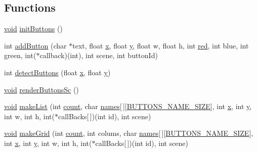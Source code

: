 \subsection*{Functions}
\begin{DoxyCompactItemize}
\item 
\hyperlink{png_8h_ac9c84fa68bbad002983e35ce3663c686}{void} \hyperlink{group___button_ga27d3ba5afb772cc36c9a432c28975ace}{init\+Buttons} ()
\item 
int \hyperlink{group___button_ga5e234145cd86fdd4aaa76eedb8ffae96}{add\+Button} (char $\ast$text, float \hyperlink{fmaths_8inl_a7ba8ab2f1e8f362163e17da3f15a5db9}{x}, float \hyperlink{fmaths_8inl_ad01ab75ae50a1a624185bfa014c66cfa}{y}, float w, float h, int \hyperlink{png_8h_a785e03b9f52b7b9ca5116a272adc908f}{red}, int blue, int green, int($\ast$callback)(int), int scene, int button\+Id)
\item 
int \hyperlink{group___button_ga010fb433acfc05067bb55db843d9d0c1}{detect\+Buttons} (float \hyperlink{fmaths_8inl_a7ba8ab2f1e8f362163e17da3f15a5db9}{x}, float \hyperlink{fmaths_8inl_ad01ab75ae50a1a624185bfa014c66cfa}{y})
\item 
\hyperlink{png_8h_ac9c84fa68bbad002983e35ce3663c686}{void} \hyperlink{group___button_ga49f288b060f05a3b0333a0d2d004754d}{render\+Buttons\+Sc} ()
\item 
\hyperlink{png_8h_ac9c84fa68bbad002983e35ce3663c686}{void} \hyperlink{group___button_ga0e48092464945615905cf787731a6225}{make\+List} (int \hyperlink{_core_8c_ad43c3812e6d13e0518d9f8b8f463ffcf}{count}, char \hyperlink{group___core_ga6341080327d9c3d3ef08fdccd4f05262}{names}\mbox{[}$\,$\mbox{]}\mbox{[}\hyperlink{group___button_ga5a86b4b0ec8a21993f74ae423ec74538}{B\+U\+T\+T\+O\+N\+S\+\_\+\+N\+A\+M\+E\+\_\+\+S\+I\+ZE}\mbox{]}, int \hyperlink{fmaths_8inl_a7ba8ab2f1e8f362163e17da3f15a5db9}{x}, int \hyperlink{fmaths_8inl_ad01ab75ae50a1a624185bfa014c66cfa}{y}, int w, int h, int($\ast$call\+Backs\mbox{[}$\,$\mbox{]})(int id), int scene)
\item 
\hyperlink{png_8h_ac9c84fa68bbad002983e35ce3663c686}{void} \hyperlink{group___button_gaec4b418c3f627ef7860290712740c425}{make\+Grid} (int \hyperlink{_core_8c_ad43c3812e6d13e0518d9f8b8f463ffcf}{count}, int colums, char \hyperlink{group___core_ga6341080327d9c3d3ef08fdccd4f05262}{names}\mbox{[}$\,$\mbox{]}\mbox{[}\hyperlink{group___button_ga5a86b4b0ec8a21993f74ae423ec74538}{B\+U\+T\+T\+O\+N\+S\+\_\+\+N\+A\+M\+E\+\_\+\+S\+I\+ZE}\mbox{]}, int \hyperlink{fmaths_8inl_a7ba8ab2f1e8f362163e17da3f15a5db9}{x}, int \hyperlink{fmaths_8inl_ad01ab75ae50a1a624185bfa014c66cfa}{y}, int w, int h, int($\ast$call\+Backs\mbox{[}$\,$\mbox{]})(int id), int scene)

\end{DoxyCompactItemize}
